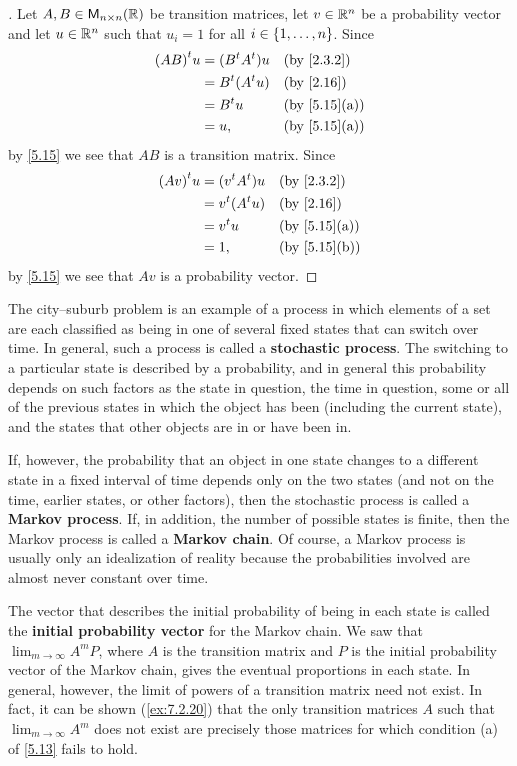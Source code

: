 \begin{proof}[]
	Let \(A, B \in \mathsf{M}_{{n} \times n}({\mathbb{R}})\) be transition matrices, let \(v \in \mathbb{R}^n\) be a probability vector and let \(u \in \mathbb{R}^n\) such that \(u_i = 1\) for all \(i \in \left\lbrace1, \dots, n\right\rbrace\).
	Since
	\begin{align*}
		\tp{(AB)} u & = (\tp{B} \tp{A}) u &  & \by{2.3.2}   \\
		            & = \tp{B} (\tp{A} u) &  & \by{2.16}    \\
		            & = \tp{B} u          &  & \by{5.15}[a] \\
		            & = u,                &  & \by{5.15}[a]
	\end{align*}
	by \cref{5.15} we see that \(AB\) is a transition matrix.
	Since
	\begin{align*}
		\tp{(Av)} u & = (\tp{v} \tp{A}) u &  & \by{2.3.2}   \\
		            & = \tp{v} (\tp{A} u) &  & \by{2.16}    \\
		            & = \tp{v} u          &  & \by{5.15}[a] \\
		            & = 1,                &  & \by{5.15}[b]
	\end{align*}
	by \cref{5.15} we see that \(Av\) is a probability vector.
\end{proof}

\begin{defn}\label{5.3.6}
	The city--suburb problem is an example of a process in which elements of a set are each classified as being in one of several fixed states that can switch over time.
	In general, such a process is called a \textbf{stochastic process}.
	The switching to a particular state is described by a probability, and in general this probability depends on such factors as the state in question, the time in question, some or all of the previous states in which the object has been (including the current state), and the states that other objects are in or have been in.

	If, however, the probability that an object in one state changes to a different state in a fixed interval of time depends only on the two states (and not on the time, earlier states, or other factors), then the stochastic process is called a \textbf{Markov process}.
	If, in addition, the number of possible states is finite, then the Markov process is called a \textbf{Markov chain}.
	Of course, a Markov process is usually only an idealization of reality because the probabilities involved are almost never constant over time.

	The vector that describes the initial probability of being in each state is called the \textbf{initial probability vector} for the Markov chain.
	We saw that \(\lim_{m \to \infty} A^m P\), where \(A\) is the transition matrix and \(P\) is the initial probability vector of the Markov chain, gives the eventual proportions in each state.
	In general, however, the limit of powers of a transition matrix need not exist.
	In fact, it can be shown (\cref{ex:7.2.20}) that the only transition matrices \(A\) such that \(\lim_{m \to \infty} A^m\) does not exist are precisely those matrices for which condition (a) of \cref{5.13} fails to hold.
\end{defn}

